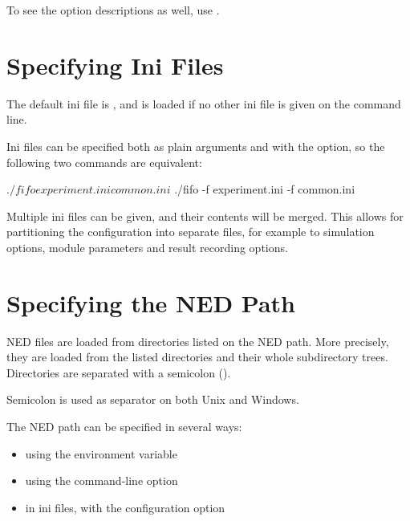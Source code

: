 To see the option descriptions as well, use .



\section{Specifying Ini Files}
\label{sec:run-sim:specifying-ini-files}

The default ini file is , and is
loaded if no other ini file is given on the command line.

Ini files can be specified both as plain arguments and with the 
option, so the following two commands are equivalent:

\begin{commandline}
$ ./fifo experiment.ini common.ini
$ ./fifo -f experiment.ini -f common.ini
\end{commandline}

Multiple ini files can be given, and their contents will be merged. This
allows for partitioning the configuration into separate files, for example
to simulation options, module parameters and result recording options.


\section{Specifying the NED Path}
\label{sec:run-sim:specifying-ned-path}

NED files are loaded from directories listed on the NED path. More precisely,
they are loaded from the listed directories and their whole subdirectory trees.
Directories are separated with a semicolon (\ttt{;}).

\begin{note}
Semicolon is used as separator on both Unix and Windows.
\end{note}

The NED path can be specified in several ways:
\begin{itemize}
  \item using the  environment variable
  \item using the  command-line option
  \item in ini files, with the  configuration option
\end{itemize}

